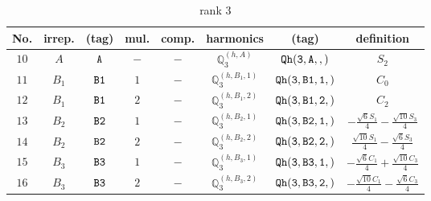 \documentclass[fleqn,8pt]{jsarticle}
\begin{document}
\begin{table}[ht!]
\begin{center}
\caption{rank 3}
\renewcommand{\arraystretch}{1.3}
\begin{tabular}{cccccccc} \hline \hline
No. & irrep. & (tag) & mul. & comp. & harmonics & (tag) & definition \\ \hline
$ 10 $ & $ A $ & $ {\tt A} $ & $ - $ & $ - $ & $ \mathbb{Q}_{3}^{(h,A)} $ & $ {\tt Qh(3,A,,)} $ & $ S_{2} $ \\
$ 11 $ & $ B_{1} $ & $ {\tt B1} $ & $ 1 $ & $ - $ & $ \mathbb{Q}_{3}^{(h,B_{1},1)} $ & $ {\tt Qh(3,B1,1,)} $ & $ C_{0} $ \\
$ 12 $ & $ B_{1} $ & $ {\tt B1} $ & $ 2 $ & $ - $ & $ \mathbb{Q}_{3}^{(h,B_{1},2)} $ & $ {\tt Qh(3,B1,2,)} $ & $ C_{2} $ \\
$ 13 $ & $ B_{2} $ & $ {\tt B2} $ & $ 1 $ & $ - $ & $ \mathbb{Q}_{3}^{(h,B_{2},1)} $ & $ {\tt Qh(3,B2,1,)} $ & $ - \frac{\sqrt{6} S_{1}}{4} - \frac{\sqrt{10} S_{3}}{4} $ \\
$ 14 $ & $ B_{2} $ & $ {\tt B2} $ & $ 2 $ & $ - $ & $ \mathbb{Q}_{3}^{(h,B_{2},2)} $ & $ {\tt Qh(3,B2,2,)} $ & $ \frac{\sqrt{10} S_{1}}{4} - \frac{\sqrt{6} S_{3}}{4} $ \\
$ 15 $ & $ B_{3} $ & $ {\tt B3} $ & $ 1 $ & $ - $ & $ \mathbb{Q}_{3}^{(h,B_{3},1)} $ & $ {\tt Qh(3,B3,1,)} $ & $ - \frac{\sqrt{6} C_{1}}{4} + \frac{\sqrt{10} C_{3}}{4} $ \\
$ 16 $ & $ B_{3} $ & $ {\tt B3} $ & $ 2 $ & $ - $ & $ \mathbb{Q}_{3}^{(h,B_{3},2)} $ & $ {\tt Qh(3,B3,2,)} $ & $ - \frac{\sqrt{10} C_{1}}{4} - \frac{\sqrt{6} C_{3}}{4} $ \\
 \hline \hline
\end{tabular}
\end{center}
\end{table}
\end{document}
